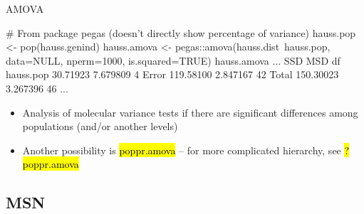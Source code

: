 \documentclass[compress, ucs, xelatex, 11pt, xcolor=svgnames,
  hyperref={
    bookmarks=true,
    unicode=true,
    colorlinks=true,
    pdftitle={Molecular data in R},
    plainpages=false,
    pdfauthor={Vojtech Zeisek},
    pdfsubject={Course about phylogeny and evolution in R},
    pdfcreator={XeLaTeX},
    pdfkeywords={R, evolution, phylogeny, molecular data},
    linkcolor=Tomato,
    anchorcolor=SaddleBrown,
    citecolor=Goldenrod,
    filecolor=DarkMagenta,
    menucolor=Sienna,
    urlcolor=DarkTurquoise,
    pdftex},
  url={hyphens, lowtilde} %
  ]{beamer}
\renewcommand{\texttt}[1]{\hl{\ttfamily #1}}
\begin{document}
\begin{frame}[fragile]{AMOVA}
  \begin{spluscode}
    # From package pegas (doesn't directly show percentage of variance)
    hauss.pop <- pop(hauss.genind)
    hauss.amova <- pegas::amova(hauss.dist~hauss.pop, data=NULL,
      nperm=1000, is.squared=TRUE)
    hauss.amova
    ...
                    SSD      MSD df
    hauss.pop  30.71923 7.679809  4
    Error     119.58100 2.847167 42
    Total     150.30023 3.267396 46
    ...
  \end{spluscode}
  \begin{itemize}
    \item Analysis of molecular variance tests if there are significant differences among populations (and/or another levels)
    \item Another possibility is \texttt{poppr.amova} -- for more complicated hierarchy, see \texttt{?poppr.amova}
  \end{itemize}
\end{frame}

\subsection{MSN}
\end{document}

